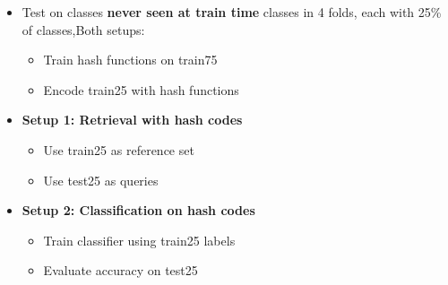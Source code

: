 \documentclass[conference]{IEEEtran}
\begin{document}
\begin{itemize}
\item Test on classes \textbf{never seen at train time}
\itemSplit classes in 4 folds, each with 25\% of classes,Both setups:
    \begin{itemize}
    \item Train hash functions on train75
    \item Encode train25 with hash functions
    \end{itemize}
\item \textbf{Setup 1: Retrieval with hash codes}
    \begin{itemize}
    \item Use train25 as reference set
    \item Use test25 as queries
    \end{itemize}
\item \textbf{Setup 2: Classification on hash codes}
    \begin{itemize}
    \item Train classifier using train25 labels
    \item Evaluate accuracy on test25
    \end{itemize}
\end{itemize}
\end{document}
